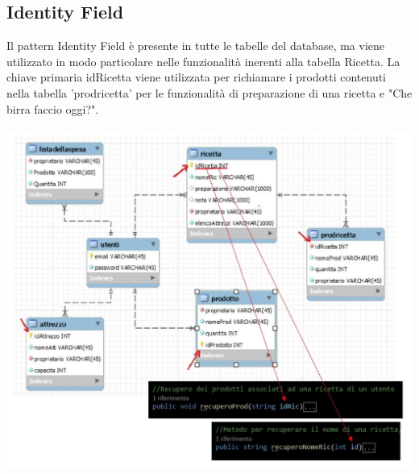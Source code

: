 \documentclass[a4paper, titlepage]{article}
\begin{document}
\subsection{Identity Field}
Il pattern Identity Field è presente in tutte le tabelle del database, ma viene utilizzato in modo particolare nelle funzionalità inerenti alla tabella Ricetta.
La chiave primaria idRicetta viene utilizzata per richiamare i prodotti contenuti nella tabella 'prodricetta' per le funzionalità di preparazione di una ricetta e "Che birra faccio oggi?".\\\\
\includegraphics[scale=0.40]{Immagini/IdentityField.jpg}
\end{document}
